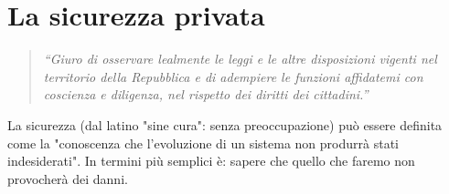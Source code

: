 \chapter{La sicurezza privata}
\label{capitolo2}
\thispagestyle{empty}

\begin{quotation}
	\noindent\footnotesize\emph{\textquotedblleft Giuro di osservare lealmente le leggi e le altre disposizioni vigenti nel territorio della Repubblica e di adempiere le funzioni affidatemi con coscienza e diligenza, nel rispetto dei diritti dei cittadini.\textquotedblright}
\end{quotation}
La sicurezza (dal latino "sine cura": senza preoccupazione) può essere definita come la "conoscenza che l'evoluzione di un sistema non produrrà stati indesiderati". In termini più semplici è: sapere che quello che faremo non provocherà dei danni.\cite{wiki:sicurezza}

